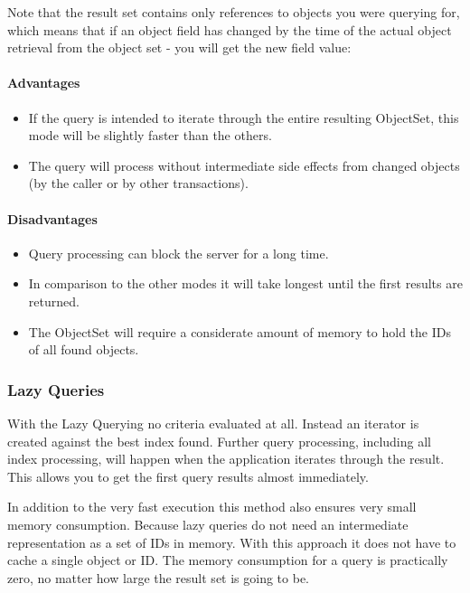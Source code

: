 Note that the result set contains only references to objects you were querying for, which means that if an object field has changed by the time of the actual object retrieval from the object set - you will get the new field value:

\paragraph*{Advantages}

\begin{itemize}
\item If the query is intended to iterate through the entire resulting ObjectSet, this mode will be slightly faster than the others.
\item The query will process without intermediate side effects from changed objects (by the caller or by other transactions).
\end{itemize}

\paragraph*{Disadvantages}

\begin{itemize}
\item Query processing can block the server for a long time.
\item In comparison to the other modes it will take longest until the first results are returned.
\item The ObjectSet will require a considerate amount of memory to hold the IDs of all found objects.
\end{itemize}

\subsubsection{Lazy Queries}
\label{ref:configuration-common-query-modes-lazy-queries}

With the Lazy Querying no criteria evaluated at all. Instead an iterator is created against the best index found. Further query processing, including all index processing, will happen when the application iterates through the result. This allows you to get the first query results almost immediately.

In addition to the very fast execution this method also ensures very small memory consumption. Because lazy queries do not need an intermediate representation as a set of IDs in memory. With this approach it does not have to cache a single object or ID. The memory consumption for a query is practically zero, no matter how large the result set is going to be.

